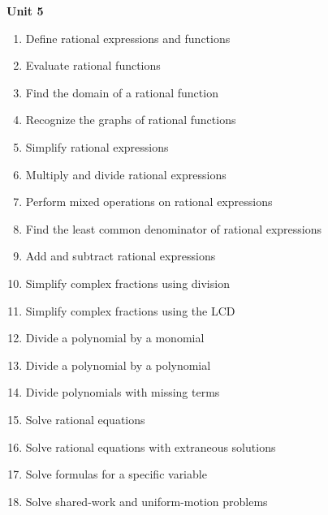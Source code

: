 \documentclass[10pt]{article}
\newenvironment{alphalist}{
\begin{enumerate}[label=(\arabic*),widest=107 ,leftmargin=25pt, itemsep=0pt]}
{\end{enumerate}}
\begin{document}
\noindent \textbf{Unit 5}
\begin{alphalist}
    \item Define rational expressions and functions
    \item Evaluate rational functions
    \item Find the domain of a rational function
    \item Recognize the graphs of rational functions
    \item Simplify rational expressions
    \item Multiply and divide rational expressions
    \item Perform mixed operations on rational expressions
    \item Find the least common denominator of rational expressions
    \item Add and subtract rational expressions
    \item Simplify complex fractions using division
    \item Simplify complex fractions using the LCD
    \item Divide a polynomial by a monomial
    \item Divide a polynomial by a polynomial
    \item Divide polynomials with missing terms 
    \item Solve rational equations
    \item Solve rational equations with extraneous solutions
    \item Solve formulas for a specific variable
    \item Solve shared-work and uniform-motion problems
\end{alphalist}
\end{document}
